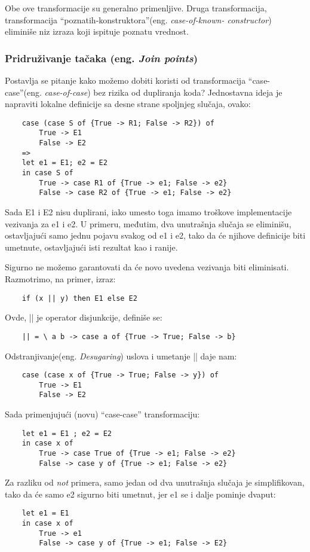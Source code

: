 Obe ove transformacije su generalno primenljive. Druga transformacija, transformacija “poznatih-konstruktora”(eng. \emph{case-of-known-
constructor}) eliminiše niz izraza koji ispituje poznatu vrednost.

\subsubsection {Pridruživanje tačaka (eng. \emph{Join points})}
\label{sec:podpodnaslovJoin}

Postavlja se pitanje kako možemo dobiti koristi od  transformacija “case-case”(eng. \emph{case-of-case}) bez rizika od dupliranja koda? Jednostavna ideja je napraviti lokalne definicije sa desne strane spoljnjeg slučaja, ovako:
\begin{verbatim}
	case (case S of {True -> R1; False -> R2}) of
		True -> E1
		False -> E2
	=>
	let e1 = E1; e2 = E2
	in case S of
		True -> case R1 of {True -> e1; False -> e2}
		False -> case R2 of {True -> e1; False -> e2}
\end{verbatim}

Sada E1 i E2 nisu duplirani, iako umesto toga imamo troškove implementacije vezivanja za e1 i e2. U primeru, međutim, dva unutrašnja slučaja se eliminišu, ostavljajući samo jednu pojavu svakog od e1 i e2, tako da će njihove definicije biti umetnute, ostavljajući isti rezultat kao i ranije.

Sigurno ne možemo garantovati da će novo uvedena vezivanja biti eliminisati. Razmotrimo, na primer, izraz:
\begin{verbatim}
	if (x || y) then E1 else E2
\end{verbatim}
Ovde, || je operator disjunkcije, definiše se:
\begin{verbatim}
	|| = \ a b -> case a of {True -> True; False -> b}
\end{verbatim}

Odstranjivanje(eng. \emph{Desugaring}) uslova i umetanje || daje nam:
\begin{verbatim}
	case (case x of {True -> True; False -> y}) of
		True -> E1
		False -> E2
\end{verbatim}

Sada primenjujući (novu) “case-case” transformaciju:
\begin{verbatim}
	let e1 = E1 ; e2 = E2
	in case x of
		True -> case True of {True -> e1; False -> e2}
		False -> case y of {True -> e1; False -> e2}
\end{verbatim}

Za razliku od \textit{not} primera, samo jedan od dva unutrašnja slučaja je simplifikovan, tako da će samo e2 sigurno biti umetnut, jer e1 se i dalje pominje dvaput:
\begin{verbatim}
	let e1 = E1
	in case x of
		True -> e1
		False -> case y of {True -> e1; False -> E2}
\end{verbatim}

